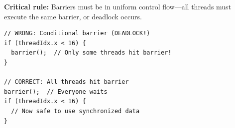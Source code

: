 \textbf{Critical rule:} Barriers must be in uniform control flow—all threads must execute the same barrier, or deadlock occurs.

\begin{lstlisting}[style=ts]
// WRONG: Conditional barrier (DEADLOCK!)
if (threadIdx.x < 16) {
  barrier();  // Only some threads hit barrier!
}

// CORRECT: All threads hit barrier
barrier();  // Everyone waits
if (threadIdx.x < 16) {
  // Now safe to use synchronized data
}
\end{lstlisting}

